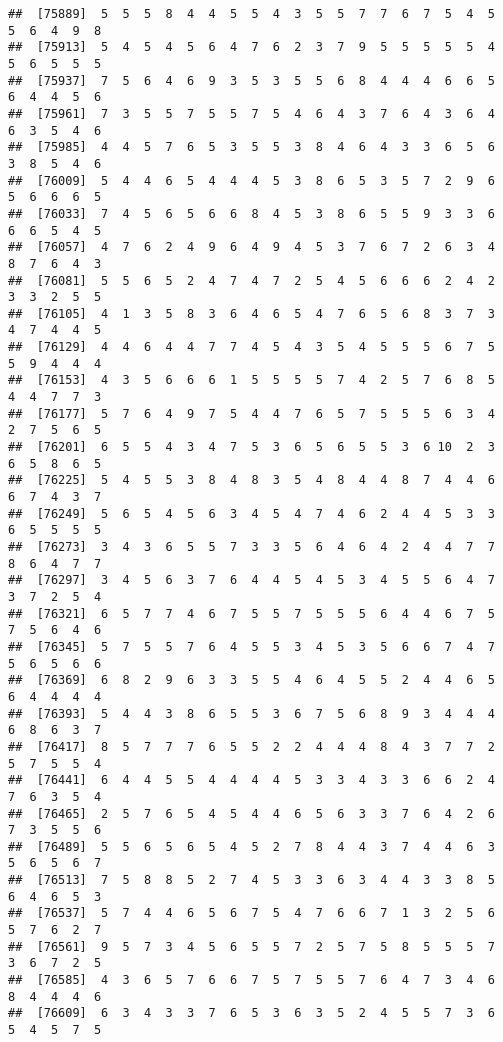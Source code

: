 \documentclass[
]{book}
\begin{document}
\begin{verbatim}
##  [75889]  5  5  5  8  4  4  5  5  4  3  5  5  7  7  6  7  5  4  5  5  6  4  9  8
##  [75913]  5  4  5  4  5  6  4  7  6  2  3  7  9  5  5  5  5  5  4  5  6  5  5  5
##  [75937]  7  5  6  4  6  9  3  5  3  5  5  6  8  4  4  4  6  6  5  6  4  4  5  6
##  [75961]  7  3  5  5  7  5  5  7  5  4  6  4  3  7  6  4  3  6  4  6  3  5  4  6
##  [75985]  4  4  5  7  6  5  3  5  5  3  8  4  6  4  3  3  6  5  6  3  8  5  4  6
##  [76009]  5  4  4  6  5  4  4  4  5  3  8  6  5  3  5  7  2  9  6  5  6  6  6  5
##  [76033]  7  4  5  6  5  6  6  8  4  5  3  8  6  5  5  9  3  3  6  6  6  5  4  5
##  [76057]  4  7  6  2  4  9  6  4  9  4  5  3  7  6  7  2  6  3  4  8  7  6  4  3
##  [76081]  5  5  6  5  2  4  7  4  7  2  5  4  5  6  6  6  2  4  2  3  3  2  5  5
##  [76105]  4  1  3  5  8  3  6  4  6  5  4  7  6  5  6  8  3  7  3  4  7  4  4  5
##  [76129]  4  4  6  4  4  7  7  4  5  4  3  5  4  5  5  5  6  7  5  5  9  4  4  4
##  [76153]  4  3  5  6  6  6  1  5  5  5  5  7  4  2  5  7  6  8  5  4  4  7  7  3
##  [76177]  5  7  6  4  9  7  5  4  4  7  6  5  7  5  5  5  6  3  4  2  7  5  6  5
##  [76201]  6  5  5  4  3  4  7  5  3  6  5  6  5  5  3  6 10  2  3  6  5  8  6  5
##  [76225]  5  4  5  5  3  8  4  8  3  5  4  8  4  4  8  7  4  4  6  6  7  4  3  7
##  [76249]  5  6  5  4  5  6  3  4  5  4  7  4  6  2  4  4  5  3  3  6  5  5  5  5
##  [76273]  3  4  3  6  5  5  7  3  3  5  6  4  6  4  2  4  4  7  7  8  6  4  7  7
##  [76297]  3  4  5  6  3  7  6  4  4  5  4  5  3  4  5  5  6  4  7  3  7  2  5  4
##  [76321]  6  5  7  7  4  6  7  5  5  7  5  5  5  6  4  4  6  7  5  7  5  6  4  6
##  [76345]  5  7  5  5  7  6  4  5  5  3  4  5  3  5  6  6  7  4  7  5  6  5  6  6
##  [76369]  6  8  2  9  6  3  3  5  5  4  6  4  5  5  2  4  4  6  5  6  4  4  4  4
##  [76393]  5  4  4  3  8  6  5  5  3  6  7  5  6  8  9  3  4  4  4  6  8  6  3  7
##  [76417]  8  5  7  7  7  6  5  5  2  2  4  4  4  8  4  3  7  7  2  5  7  5  5  4
##  [76441]  6  4  4  5  5  4  4  4  4  5  3  3  4  3  3  6  6  2  4  7  6  3  5  4
##  [76465]  2  5  7  6  5  4  5  4  4  6  5  6  3  3  7  6  4  2  6  7  3  5  5  6
##  [76489]  5  5  6  5  6  5  4  5  2  7  8  4  4  3  7  4  4  6  3  5  6  5  6  7
##  [76513]  7  5  8  8  5  2  7  4  5  3  3  6  3  4  4  3  3  8  5  6  4  6  5  3
##  [76537]  5  7  4  4  6  5  6  7  5  4  7  6  6  7  1  3  2  5  6  5  7  6  2  7
##  [76561]  9  5  7  3  4  5  6  5  5  7  2  5  7  5  8  5  5  5  7  3  6  7  2  5
##  [76585]  4  3  6  5  7  6  6  7  5  7  5  5  7  6  4  7  3  4  6  8  4  4  4  6
##  [76609]  6  3  4  3  3  7  6  5  3  6  3  5  2  4  5  5  7  3  6  5  4  5  7  5

\end{verbatim}
\end{document}
